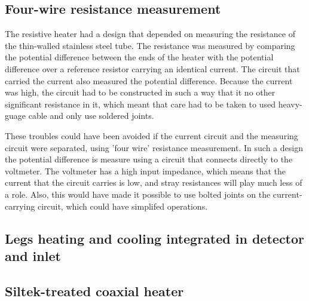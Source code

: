 \subsection{Four-wire resistance measurement}

The resistive heater had a design that depended on measuring the resistance of
the thin-walled stainless steel tube. The resistance was measured by comparing
the potential difference between the ends of the heater with the potential
difference over a reference resistor carrying an identical current. The circuit
that carried the current also measured the potential difference. Because the
current was high, the circuit had to be constructed in such a way that it no
other significant resistance in it, which meant that care had to be taken to
used heavy-guage cable and only use soldered joints. 

These troubles could have been avoided if the current circuit and the measuring
circuit were separated, using 'four wire' resistance measurement. In such a
design the potential difference is measure using a circuit that connects
directly to the voltmeter. The voltmeter has a high input impedance, which means
that the current that the circuit carries is low, and stray resistances will
play much less of a role. Also, this would have made it possible to use bolted
joints on the current-carrying circuit, which could have simplifed operations.

\subsection{Legs heating and cooling integrated in detector and inlet}


\subsection{Siltek-treated coaxial heater}



\todos
